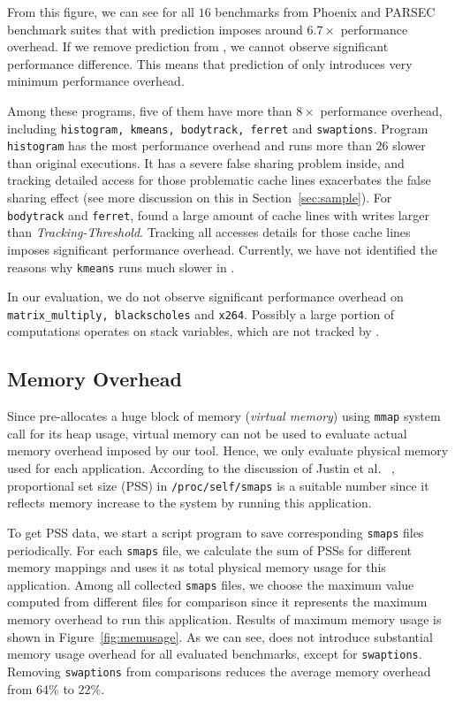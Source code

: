 From this figure, we can see for all $16$ benchmarks from Phoenix and PARSEC
benchmark suites that \Predator{} with prediction imposes around $6.7\times$
performance overhead. 
If we remove prediction from \Predator{}, we cannot observe significant performance difference.
This means that prediction of \Predator{} only introduces very minimum performance overhead. 

Among these programs, five of them have more than $8\times$ performance overhead, 
including \texttt{histogram, kmeans, bodytrack, ferret} and \texttt{swaptions}. 
Program \texttt{histogram} has the most performance overhead and 
runs more than $26$ slower than original executions. 
It has a severe false sharing problem inside, and tracking detailed access for those
problematic cache lines exacerbates the 
false sharing effect (see more discussion on this in Section~\ref{sec:sample}). 
For \texttt{bodytrack} and \texttt{ferret}, \Predator{} found a large amount of cache lines with 
writes larger than {\it Tracking-Threshold}. 
Tracking all accesses details for those cache lines 
imposes significant performance overhead. 
Currently, we have not identified the reasons 
why \texttt{kmeans} runs much slower in \Predator{}.   

In our evaluation, we do not observe significant performance overhead on 
\texttt{matrix\_multiply, blackscholes} and 
\texttt{x264}.
Possibly a large portion of computations operates on stack variables, which are
not tracked by \Predator{}. 

\subsection{Memory Overhead}
\label{sec:memoverhead}
Since \Predator{} pre-allocates a huge block of memory ({\it virtual memory}) 
using \texttt{mmap} system call for its heap usage, 
virtual memory can not be used to evaluate actual memory overhead imposed by our tool. 
Hence, we only evaluate physical memory used for each application. 
According to the discussion of Justin et al. ~\cite{memusage}, proportional set size (PSS) 
in \texttt{/proc/self/smaps} is a suitable number since it reflects memory increase to the system
by running this application. 

To get PSS data, we start a script program to save 
corresponding \texttt{smaps} files periodically.
For each \texttt{smaps} file, we calculate the sum of PSSs for different
memory mappings and uses it as total physical memory usage for this application.
Among all collected \texttt{smaps} files, we choose the maximum value computed from
different files for comparison 
since it represents the maximum memory overhead to run this application.
Results of maximum memory usage is shown in Figure~\ref{fig:memusage}. As we can see,
\Predator{} does not introduce substantial memory usage overhead 
for all evaluated benchmarks, except for \texttt{swaptions}. 
Removing \texttt{swaptions} from comparisons reduces 
the average memory overhead from 64\% to 22\%. 

